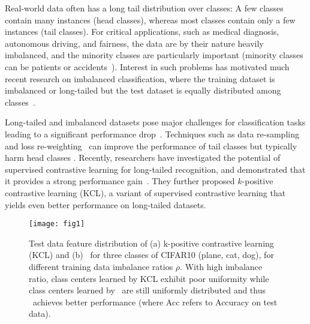 Real-world data often has a long tail distribution over classes: A few classes contain many instances (head classes), whereas most classes contain only a few instances (tail classes). For critical applications, such as medical diagnosis, autonomous driving, and fairness, the data are by their nature heavily imbalanced, and the minority classes are particularly important (minority classes can be patients or accidents~\cite{shen2015long,yang2022multi,yang2021delving}). Interest in such problems has motivated much recent research on imbalanced classification, where the training dataset is imbalanced or long-tailed but the test dataset is equally distributed among classes~\cite{kang2019decoupling,wang2020long,yang2020rethinking,cao2019learning,yang2022multi}. 

Long-tailed and imbalanced datasets pose major challenges for classification tasks leading to a significant performance drop~\cite{ando2017deep, buda2018systematic, collobert2008unified, yang2019me, wu2020solving}. Techniques such as data re-sampling~\cite{chawla2002smote, shen2016relay, buda2018systematic, ando2017deep} and  loss re-weighting~\cite{cao2019learning, cui2019class, dong2018imbalanced, khan2019striking, khan2017cost, byrd2019effect} can improve the performance of tail classes but typically harm head classes \cite{kang2019decoupling}.
Recently, researchers have investigated the potential of supervised contrastive learning for long-tailed recognition, and demonstrated that it provides a strong performance gain~\cite{kang2020exploring}. They further proposed $k$-positive contrastive learning (KCL), a variant of supervised contrastive learning that yields even better performance on long-tailed datasets.

\begin{figure}[t]
\begin{center}
\texttt{[image: fig1]} 
\end{center}
\vspace{-10pt}
\caption{\small
Test data feature distribution of (a) k-positive contrastive learning (KCL) and (b) \name\ for three classes of CIFAR10 (plane, cat, dog), for different training data imbalance ratios $\rho$. With high imbalance ratio, class centers learned by KCL exhibit poor uniformity while class centers learned by \name~are still uniformly distributed and thus \name\ achieves better performance (where Acc refers to Accuracy on test data).}
\label{fig:intro}
\vspace{-10pt}
\end{figure}


